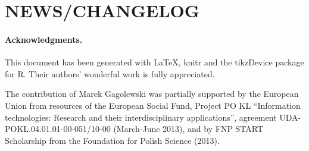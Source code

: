 \documentclass[11pt]{article}\usepackage{graphicx, color}
\makeatletter
\newenvironment{kframe}{%
 \def\at@end@of@kframe{}%
 \ifinner\ifhmode%
  \def\at@end@of@kframe{\end{minipage}}%
  \begin{minipage}{\columnwidth}%
 \fi\fi%
 \def\FrameCommand##1{\hskip\@totalleftmargin \hskip-\fboxsep
 \colorbox{shadecolor}{##1}\hskip-\fboxsep
     \hskip-\linewidth \hskip-\@totalleftmargin \hskip\columnwidth}%
 \MakeFramed {\advance\hsize-\width
   \@totalleftmargin\z@ \linewidth\hsize
   \@setminipage}}%
 {\par\unskip\endMakeFramed%
 \at@end@of@kframe}
\newenvironment{knitrout}{}{} %
\newcommand{\package}[1]{\textsf{#1}\xspace}
\newcommand{\lang}[1]{\textsf{#1}\xspace}
\newcommand{\R}{\lang{R}}
\theoremstyle{remark}
\theoremstyle{definition}
\makeatother
\begin{document}



\section{NEWS/CHANGELOG}

\begin{knitrout}\small
{}\color{fgcolor}\begin{kframe}


{\ttfamily\noindent\color{warningcolor}{Warning: cannot open file '../../NEWS': No such file or directory}}

{\ttfamily\noindent\bfseries\color{errorcolor}{Error: cannot open the connection}}\end{kframe}
\end{knitrout}



\paragraph{Acknowledgments.}
This document has been generated with \LaTeX, \package{knitr} and
the \package{tikzDevice} package for \R.
Their authors' wonderful work is fully appreciated.


The contribution of Marek Gagolewski was partially supported
by the European Union from resources of the European Social Fund, Project PO KL 
``Information technologies: Research and their interdisciplinary
applications'', agreement UDA-POKL.04.01.01-00-051/10-00 (March-June 2013),
and by FNP START Scholarship from the Foundation for Polish Science (2013).
\end{document}
